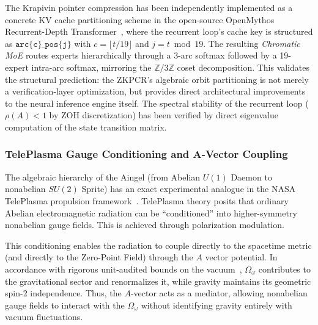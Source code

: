 \begin{remark}
The Krapivin pointer compression has been independently implemented as a concrete KV cache partitioning scheme in the open-source OpenMythos Recurrent-Depth Transformer~\cite{Gomez2026OpenMythos}, where the recurrent loop's cache key is structured as $\texttt{arc\{c\}\_pos\{j\}}$ with $c = \lfloor t / 19 \rfloor$ and $j = t \bmod 19$. The resulting \emph{Chromatic MoE} routes experts hierarchically through a 3-arc softmax followed by a 19-expert intra-arc softmax, mirroring the $\mathbb{Z}/3\mathbb{Z}$ coset decomposition. This validates the structural prediction: the ZKPCR's algebraic orbit partitioning is not merely a verification-layer optimization, but provides direct architectural improvements to the neural inference engine itself. The spectral stability of the recurrent loop ($\rho(A) < 1$ by ZOH discretization) has been verified by direct eigenvalue computation of the state transition matrix.
\end{remark}

\subsubsection{TelePlasma Gauge Conditioning and A-Vector Coupling}

The algebraic hierarchy of the Aingel (from Abelian $U(1)$ Daemon to nonabelian $SU(2)$ Sprite) has an exact experimental analogue in the NASA TelePlasma propulsion framework~\cite{TelePlasma2000}. TelePlasma theory posits that ordinary Abelian electromagnetic radiation can be ``conditioned'' into higher-symmetry nonabelian gauge fields. This is achieved through polarization modulation.

This conditioning enables the radiation to couple directly to the spacetime metric (and directly to the Zero-Point Field) through the $A$ vector potential. In accordance with rigorous unit-audited bounds on the vacuum~\cite{lockwood_zpe2025}, $\Omega_\omega$ contributes to the gravitational sector and renormalizes it, while gravity maintains its geometric spin-2 independence. Thus, the $A$-vector acts as a mediator, allowing nonabelian gauge fields to interact with the $\Omega_\omega$ without identifying gravity entirely with vacuum fluctuations.

